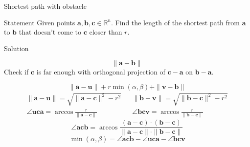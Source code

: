 \documentclass[10pt]{beamer}
\begin{document}
\begin{frame}{Shortest path with obstacle}
    \begin{block}{Statement}
        Given points $\mathbf a, \mathbf b, \mathbf c \in \mathbb R^n$. Find the length of the shortest path from $\mathbf a$ to $\mathbf b$ that doesn't come to $\mathbf c$ closer than $r$.
    \end{block}
\end{frame}

\begin{frame}{Solution}
    \begin{center}
        
    \end{center}
    $$\|\mathbf a- \mathbf b\|$$
    Check if $\mathbf c$ is far enough with orthogonal projection of $\mathbf c - \mathbf a$ on $\mathbf b - \mathbf a$.
\end{frame}

\begin{frame}
    \begin{center}
        
    \end{center}
    $$\|\mathbf a - \mathbf u\| + r\min(\alpha,\beta) + \|\mathbf v - \mathbf b\|$$
    \begin{align*}
        \|\mathbf a - \mathbf u\| = \sqrt{\|\mathbf a - \mathbf c\|^2 - r^2} & & \|\mathbf b - \mathbf v\| = \sqrt{\|\mathbf b - \mathbf c\|^2 - r^2} \\
        \angle \mathbf u \mathbf c \mathbf a = \arccos \frac{r}{\|\mathbf a-\mathbf c\|} & & \angle \mathbf b \mathbf c \mathbf v = \arccos \frac{r}{\|\mathbf b-\mathbf c\|}
    \end{align*}
    $$\angle \mathbf a \mathbf c \mathbf b = \arccos \frac{(\mathbf a - \mathbf c) \cdot (\mathbf b - \mathbf c)}{\|\mathbf a - \mathbf c\| \cdot \|\mathbf b - \mathbf c\|} $$
    $$\min(\alpha, \beta) = \angle \mathbf a \mathbf c \mathbf b - \angle \mathbf u \mathbf c \mathbf a - \angle \mathbf b \mathbf c \mathbf v$$
\end{frame}
\end{document}
